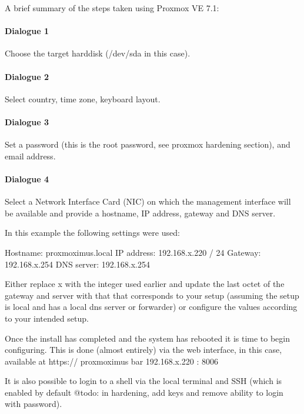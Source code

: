 A brief summary of the steps taken using Proxmox VE 7.1:

\hypertarget{dialogue-1}{%
\paragraph{Dialogue 1}\label{dialogue-1}}

Choose the target harddisk (/dev/sda in this case).

\hypertarget{dialogue-2}{%
\paragraph{Dialogue 2}\label{dialogue-2}}

Select country, time zone, keyboard layout.

\hypertarget{dialogue-3}{%
\paragraph{Dialogue 3}\label{dialogue-3}}

Set a password (this is the root password, see proxmox hardening
section), and email address.

\hypertarget{dialogue-4}{%
\paragraph{Dialogue 4}\label{dialogue-4}}

Select a Network Interface Card (NIC) on which the management interface
will be available and provide a hostname, IP address, gateway and DNS
server.

In this example the following settings were used:

Hostname: proxmoximus.local IP address: 192.168.x.220 / 24 Gateway:
192.168.x.254 DNS server: 192.168.x.254

Either replace x with the integer used earlier and update the last octet
of the gateway and server with that that corresponds to your setup
(assuming the setup is local and has a local dns server or forwarder) or
configure the values according to your intended setup.

Once the install has completed and the system has rebooted it is time to
begin configuring. This is done (almost entirely) via the web interface,
in this case, available at https:// proxmoximus bar{} 192.168.x.220
: 8006

It is also possible to login to a shell via the local terminal and SSH
(which is enabled by default @todo: in hardening, add keys and remove
ability to login with password).

